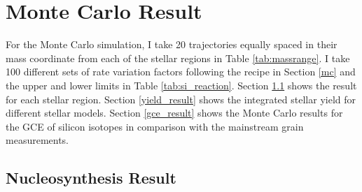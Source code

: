 \documentclass{brandeis-thesis3.2}
\newcommand{\iso}[2]{$^{#1}${#2}}
\begin{document}


\chapter{Monte Carlo Result} \label{mc_result}
For the Monte Carlo simulation, I take 20 trajectories equally spaced in their mass coordinate from each of the stellar regions in Table \ref{tab:massrange}. I take 100 different sets of rate variation factors following the recipe in Section \ref{mc} and the upper and lower limits in Table \ref{tab:si_reaction}. Section \ref{nucleo_result} shows the result for each stellar region. Section \ref{yield_result} shows the integrated stellar yield for different stellar models. Section \ref{gce_result} shows the Monte Carlo results for the GCE of silicon isotopes in comparison with the mainstream grain measurements. 

\section{Nucleosynthesis Result} \label{nucleo_result}
\end{document}
